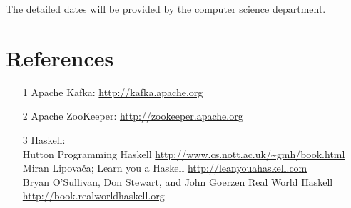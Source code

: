 The detailed dates will be provided by the computer science department.

\section*{References}
\begin{itemize}
    \item [1] Apache Kafka: \url{http://kafka.apache.org}
    \item [2] Apache ZooKeeper: \url{http://zookeeper.apache.org}
    \item [3] Haskell: \\
           Hutton Programming Haskell
           \url{http://www.cs.nott.ac.uk/~gmh/book.html}\\
            Miran Lipovača; Learn you a Haskell
            \url{http://leanyouahaskell.com} \\
            Bryan O'Sullivan, Don Stewart, and John Goerzen  Real World Haskell 
            \url{http://book.realworldhaskell.org}
\end{itemize}

